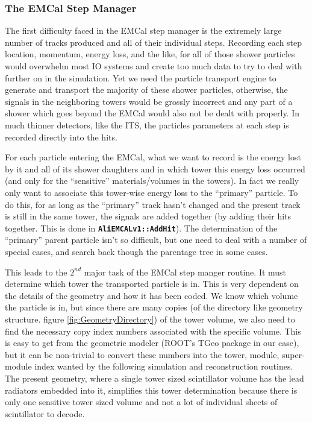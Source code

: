 \subsubsection{The EMCal Step Manager}
The first difficulty faced in the EMCal step manager is the extremely large
number of tracks produced and all of their individual steps. Recording each
step location, momentum, energy loss, and the like, for all of those
shower particles would overwhelm most IO systems and create too much
data to try to deal with further on in the simulation. Yet we need the 
particle transport engine to generate and transport the majority of 
these shower particles, otherwise, the signals in the neighboring 
towers would be grossly incorrect and any part of a shower which goes 
beyond the EMCal would also not be dealt with properly. In much thinner 
detectors, like the ITS, the particles parameters at each step is 
recorded directly into the hits.

For each particle entering the EMCal, what we want to record is the
energy lost by it and all of its shower daughters and in which tower
this energy loss occurred (and only for the ``sensitive'' materials/volumes
in the towers). In fact we really only want to associate this tower-wise
energy loss to the ``primary'' particle. To do this, for as long as the
``primary'' track hasn't changed and the present track is still in the
same tower, the signals are added together (by adding their hits together.
This is done in \texttt{\bf AliEMCALv1::AddHit}). The determination of the
``primary'' parent particle isn't so difficult, but one need to 
deal with a number of special cases, and search back though the
parentage tree in some cases.

This leads to the $2^{nd}$ major task of the EMCal step manger routine. It
must determine which tower the transported particle is in. This is very
dependent on the details of the geometry and how it has been coded. 
We know which volume the particle is in, but since there are many
copies (of the directory like geometry structure. figure 
\ref{fig:GeometryDirectory})  of the tower volume,
we also need to find the necessary copy index numbers associated with
the specific volume. This is easy to get from the geometric modeler
(ROOT's TGeo package in our case), but it can be non-trivial to 
convert these numbers into the tower, module, super-module index
wanted by the following simulation and reconstruction routines.
The present geometry, where a single tower sized scintillator
volume has the lead radiators embedded into it, simplifies this
tower determination because there is only one sensitive tower
sized volume and not a lot of individual sheets of scintillator
to decode.

